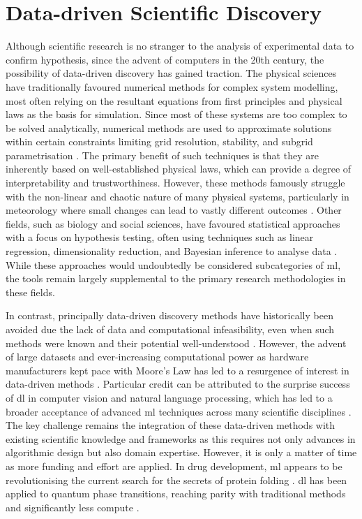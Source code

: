 \section{Data-driven Scientific Discovery}

Although scientific research is no stranger to the analysis of experimental data to confirm hypothesis, since the advent of computers in the 20th century, the possibility of data-driven discovery has gained traction. The physical sciences have traditionally favoured numerical methods for complex system modelling, most often relying on the resultant equations from first principles and physical laws as the basis for simulation. Since most of these systems are too complex to be solved analytically, numerical methods are used to approximate solutions within certain constraints limiting grid resolution, stability, and subgrid parametrisation \citep{Lynch2008}. The primary benefit of such techniques is that they are inherently based on well-established physical laws, which can provide a degree of interpretability and trustworthiness. However, these methods famously struggle with the non-linear and chaotic nature of many physical systems, particularly in meteorology where small changes can lead to vastly different outcomes \citep{Lorenz1963}. Other fields, such as biology and social sciences, have favoured statistical approaches with a focus on hypothesis testing, often using techniques such as linear regression, dimensionality reduction, and Bayesian inference to analyse data . While these approaches would undoubtedly be considered subcategories of \acrshort{ml}, the tools remain largely supplemental to the primary research methodologies in these fields.

In contrast, principally data-driven discovery methods have historically been avoided due the lack of data and computational infeasibility, even when such methods were known and their potential well-understood . However, the advent of large datasets and ever-increasing computational power as hardware manufacturers kept pace with Moore's Law  has led to a resurgence of interest in data-driven methods . Particular credit can be attributed to the surprise success of \acrfull{dl} in computer vision and natural language processing, which has led to a broader acceptance of advanced \acrfull{ml} techniques across many scientific disciplines . The key challenge remains the integration of these data-driven methods with existing scientific knowledge and frameworks as this requires not only advances in algorithmic design but also domain expertise. However, it is only a matter of time as more funding and effort are applied. In drug development, \acrfull{ml} appears to be revolutionising the current search for the secrets of protein folding . \acrshort{dl} has been applied to quantum phase transitions, reaching parity with traditional methods and significantly less compute .

